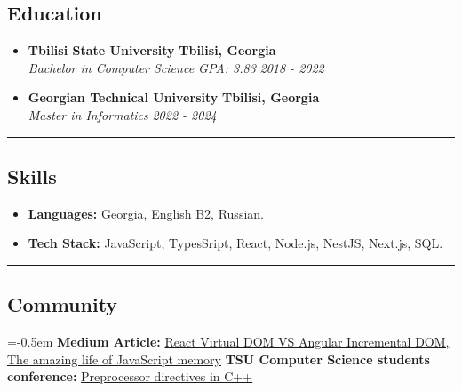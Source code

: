 \documentclass[10pt,letterpaper]{article}
\begin{document}
\subsection*{Education}
  \begin{itemize}
    \parskip=1em
      \vspace{0.05em}

    \item[]
    {\textbf{Tbilisi State University}}
     \hfill
     \textbf{Tbilisi, Georgia}
    \\
    {\emph{Bachelor in Computer Science GPA: 3.83}
     \hfill
     \emph{2018 - 2022}}

    \item[]
    {\textbf{Georgian Technical University}}
     \hfill
     \textbf{Tbilisi, Georgia}
    \\
    {\emph{Master in Informatics}
     \hfill
     \emph{2022 - 2024}}
  \end{itemize}

\hrule
\vspace{-1.0em}
\subsection*{Skills}
\begin{itemize}
  \parskip=-0.5em
  \vspace{0.05em}
  \item[] \textbf{Languages:} Georgia, English B2, Russian.
  \vspace{0.5em}
  \item[] \textbf{Tech Stack:} JavaScript, TypesSript, React, Node.js, NestJS, Next.js, SQL.
\end{itemize}

\hrule
\vspace{-1.0em}
\subsection*{Community}
\begin{itemize}
  \parskip=-0.5em
  \vspace{0.05em}
  \newline \textbf {Medium Article:} \href {https://medium.com/@giorgi-dogadze/%E1%83%A0%E1%83%90-%E1%83%90%E1%83%A0%E1%83%98%E1%83%A1-react-virtual-dom-%E1%83%93%E1%83%90-angular-incremental-dom-dec1488d5393} {React Virtual DOM VS Angular Incremental DOM, } \href {https://medium.com/@giorgi-dogadze/the-amazing-life-of-javascript-memory-%E1%83%90%E1%83%9C%E1%83%A3-%E1%83%A2%E1%83%98%E1%83%90%E1%83%9C%E1%83%A8%E1%83%90%E1%83%9C%E1%83%98-9183e20b6cfd} {The amazing life of JavaScript memory}
  \vspace{0.05em}
  \newline \textbf {TSU Computer Science students conference:} \href {https://computing.tsu.ge/ka/news/15} {Preprocessor directives in C++}
  
\end{itemize}
\end{document}
